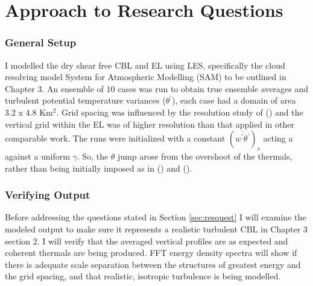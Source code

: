 \section{Approach to Research Questions}
\label{sec:Approach}
\subsubsection{General Setup}

I modelled the dry shear free \acs{CBL} and \acs{EL} using \acs{LES}, specifically the cloud resolving model System for Atmospheric Modelling (SAM) to be outlined in Chapter 3.  An ensemble of 10 cases was run to obtain true ensemble averages and turbulent potential temperature variances ($\theta^{'}$), each case had a domain of area 3.2 x 4.8 Km$^{2}$. Grid spacing was influenced by the resolution study of \citeauthor{SullPat} (\citeyear{SullPat}) and the vertical grid within the \acs{EL} was of higher resolution than that applied in other comparable work.  The runs were initialized with a constant $(\overline{w^{'}\theta^{'}})_{s}$ acting a against a uniform $\gamma$.  So, the  $\theta$ jump arose from the overshoot of the thermals, rather than being initially imposed as in \citeauthor{SullMoengStev} (\citeyear{SullMoengStev}) and \citeauthor{BrooksFowler2} (\citeyear{BrooksFowler2}).\\

\subsubsection{Verifying Output}

Before addressing the questions stated in Section \ref{sec:resquest} I will examine the modeled output to make sure it represents a realistic turbulent \acs{CBL} in Chapter 3 section 2. I will verify that the averaged vertical profiles are as expected and coherent thermals are being produced.  FFT energy density spectra will show if there is adequate scale separation between the structures of greatest energy and the grid spacing, and that realistic, isotropic turbulence is being modelled.  

